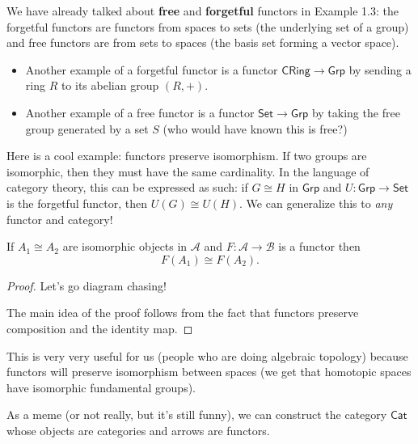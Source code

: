 \begin{example}
    We have already talked about \textbf{free} and \textbf{forgetful} functors in Example 1.3: the forgetful functors are functors from spaces to sets (the underlying set of a group) and free functors are from sets to spaces (the basis set forming a vector space).
    \begin{itemize}
        \item Another example of a forgetful functor is a functor $\mathsf{CRing}\to \mathsf{Grp}$ by sending a ring $R$ to its abelian group $(R,+)$.
        \item Another example of a free functor is a functor $\mathsf{Set}\to \mathsf{Grp}$ by taking the free group generated by a set $S$ (who would have known this is free?)
    \end{itemize}
\end{example}
Here is a cool example: functors preserve isomorphism. If two groups are isomorphic, then they must have the same cardinality. In the language of category theory, this can be expressed as such: if $G\cong H$ in $\mathsf{Grp}$ and $U \colon \mathsf{Grp} \to \mathsf{Set}$ is the forgetful functor, then $U(G)\cong U(H)$. We can generalize this to \emph{any} functor and category!
\begin{theorem}
    If $A_1\cong A_2$ are isomorphic objects in $\mathcal{A}$ and $F \colon \mathcal{A} \to \mathcal{B}$ is a functor then \[
        F(A_1)\cong F(A_2).
    \] 
\end{theorem}
\begin{proof}
Let's go diagram chasing!
            \begin{figure}[H]
                \centering
            \end{figure}
The main idea of the proof follows from the fact that functors preserve composition and the identity map. 
\end{proof}
This is very very useful for us (people who are doing algebraic topology) because functors will preserve isomorphism between spaces (we get that homotopic spaces have isomorphic fundamental groups).
\begin{note}
    As a meme (or not really, but it's still funny), we can construct the category $\mathsf{Cat}$ whose objects are categories and arrows are functors.
\end{note}

